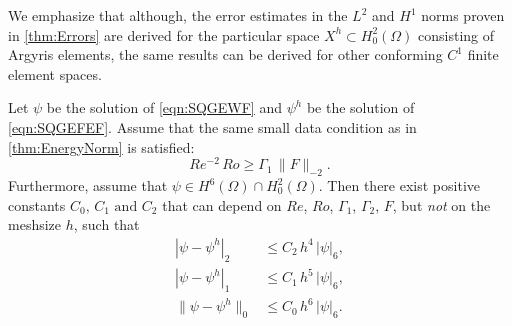 We emphasize that although, the error estimates in the $L^2$ and $H^1$ norms
proven in \autoref{thm:Errors} are derived for the particular space $X^h\subset
H^2_0(\Omega)$ consisting of Argyris elements, the same results can be derived
for other conforming $C^1$ finite element spaces.
\begin{thm} \label{thm:Errors}
  Let $\psi$ be the solution of \eqref{eqn:SQGEWF} and $\psi^h$ be the solution
  of \eqref{eqn:SQGEFEF}.  Assume that the same small data condition as in
  \autoref{thm:EnergyNorm} is satisfied:
  \begin{equation}
    Re^{-2} \, Ro \geq \Gamma_1 \, \| F \|_{-2} .
    \label{eqn:small_data_condition_dual}
  \end{equation}
  Furthermore, assume that $\psi\in H^6(\Omega) \cap H^2_0(\Omega)$.  Then there
  exist positive constants $C_0, \, C_1 \text{ and } C_2$ that can depend on
  $Re$, $Ro$, $\Gamma_1$, $\Gamma_2$, $F$, but \emph{not} on the meshsize $h$, such that
  \begin{align}
    |\psi - \psi^h|_2 &\le C_2 \, h^4\, |\psi|_6, \label{eqn:H2Error} \\
    |\psi - \psi^h|_1 &\le C_1 \, h^5\, |\psi|_6, \label{eqn:H1Error} \\
    \|\psi - \psi^h\|_0 &\le C_0 \, h^6\, |\psi|_6. \label{eqn:L2Error}
  \end{align}
\end{thm}
